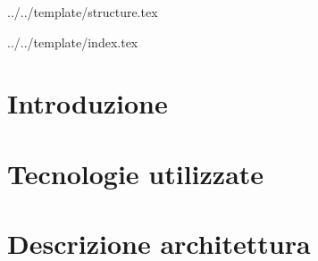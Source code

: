 


\def\DOCUMENTO{Specifica tecnica}
\def\VERSIONE{1.0.0}

\def\DESCRIZIONE{<Info documento}

\def\REDATTORE {<Redattore>}
\def\VERIFICATORE {<Verificatore>}
\def\RESPONSABILE {Carraro Nicola}

\def\USO {Esterno}

\def\DISTRIBUZIONE {\GRUPPO{}\\ & \COMMITTENTE{}\\}

\def\DESCRIZIONE {Specifica tecnica e architettura dell'applicazione Premi}


\def\INDICE	{true}
\def\TABELLE {true}
\def\FIGURE {true}


 {../../template/structure.tex}


 {../../template/index.tex}



\section{Introduzione}


\newpage

\section{Tecnologie utilizzate}


\newpage

\section{Descrizione architettura}


\newpage



